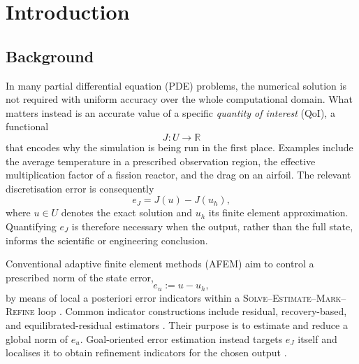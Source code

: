 \chapter{Introduction}
\label{chap:introduction}

\section{Background}
\label{sec:introduction-background}

In many partial differential equation (PDE) problems, the numerical solution is not required with uniform accuracy over the whole computational domain. What matters instead is an accurate value of a specific \emph{quantity of interest} (QoI), a functional
\begin{equation*}
  J : U \longrightarrow \mathbb{R}
  \label{eq:intro-qoi-map}
\end{equation*}
that encodes why the simulation is being run in the first place. Examples include the average temperature in a prescribed observation region, the effective multiplication factor of a fission reactor, and the drag on an airfoil. The relevant discretisation error is consequently
\begin{equation*}
  e_J = J(u)-J(u_h),
  \label{eq:intro-goal-error}
\end{equation*}
where \(u\in U\) denotes the exact solution and \(u_h\) its finite element approximation. Quantifying \(e_J\) is therefore necessary when the output, rather than the full state, informs the scientific or engineering conclusion.


Conventional adaptive finite element methods (AFEM) aim to control a prescribed norm of the state error,
\[
e_u:=u-u_h,
\]
by means of local a posteriori error indicators within a \textsc{Solve--Estimate--Mark--Refine} loop \cite{ENDTMAYER202419}. Common indicator constructions include residual, recovery-based, and equilibrated-residual estimators \cite{Ainsworth_Oden_1997}. Their purpose is to estimate and reduce a global norm of \(e_u\). Goal-oriented error estimation instead targets \(e_J\) itself and localises it to obtain refinement indicators for the chosen output \cite{Becker_Rannacher_2001,Bangerth_Rannacher_2003}.

